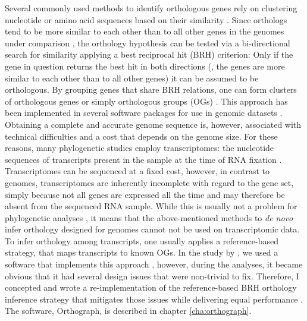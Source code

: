 Several commonly used methods to identify orthologous genes rely on
clustering nucleotide or amino acid sequences based on their similarity
\citep{Chen2007a}. Since orthologs tend to be more similar to each other
than to all other genes in the genomes under comparison
\citep{Altenhoff2012a}, the orthology hypothesis can be tested via a
bi-directional search for similarity applying a best reciprocal hit
(BRH) criterion: Only if the gene in question returns the best hit in
both directions (\ie, the genes are more similar to each other than to
all other genes) it can be assumed to be orthologous. By grouping genes
that share BRH relations, one can form clusters of orthologous genes or
simply orthologous groups (OGs) \citep{Altenhoff2012}. This approach has
been implemented in several software packages for use in genomic
datasets \citep{Li2003, Tatusov2003, Berglund2008, Zdobnov2017}.
Obtaining a complete and accurate genome sequence is, however,
associated with technical difficulties and a cost that depends on the
genome size. For these reasons, many phylogenetic studies employ
transcriptomes: the nucleotide sequences of transcripts present in the
sample at the time of RNA fixation \citep{Wang2009}. Transcriptomes can
be sequenced at a fixed cost, however, in contrast to genomes,
transcriptomes are inherently incomplete with regard to the gene set,
simply because not all genes are expressed all the time and may
therefore be absent from the sequenced RNA sample. While this is usually
not a problem for phylogenetic analyses \citep{Wiens2006}, it means that
the above-mentioned methods to \emph{de novo} infer orthology designed
for genomes cannot not be used on transcriptomic data. To infer
orthology among transcripts, one usually applies a reference-based
strategy, that maps transcripts to known OGs. In the study by
\citet{Misof2014}, we used a software that implements this approach
\citep{Ebersberger2009}, however, during the analyses, it became obvious
that it had several design issues that were non-trivial to fix.
Therefore, I concepted and wrote a re-implementation of the
reference-based BRH orthology inference strategy that mitigates those
issues while delivering equal performance \citep{Petersen2017}.  The
software, Orthograph, is described in chapter \ref{cha:orthograph}.

